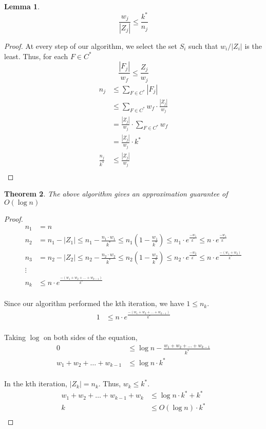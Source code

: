 \documentclass[10pt]{article}
\newtheorem{theorem}{Theorem}[section]
\newtheorem{lemma}[theorem]{Lemma}
\begin{document}
\begin{lemma}
$$
\frac{w_j}{|Z_j|} \leq \frac{k^*}{n_j}
$$
\end{lemma}
\begin{proof}
At every step of our algorithm, we select the set $S_i$ such that $w_i / |Z_i|$ is the least. Thus, for each $F \in C^*$
\[
\frac{|F_j|}{w_f} \leq \frac{Z_j}{w_j}
\]
\begin{align*}
n_j & \leq \displaystyle \sum_{F \in C^*} |F_j| \\
    & \leq \displaystyle \sum_{F \in C^*} w_f \cdot \frac{|Z_j|}{w_j} \\
    & = \frac{|Z_j|}{w_j} \cdot \displaystyle \sum_{F \in C^*} w_f \\
    & = \frac{|Z_j|}{w_j} \cdot k^* \\
\frac{n_j}{k^*} & \leq \frac{|Z_j|}{w_j} \\
\end{align*}
\end{proof}
\bigskip

\begin{theorem}
The above algorithm gives an approximation guarantee of $O(\log{n})$
\end{theorem}
\begin{proof}
\begin{align*}
n_1 & = n \\
n_2 & = n_1 - |Z_1| \leq n_1 - \frac{n_1 \cdot w_1}{k^*} \leq n_1(1 - \frac{w_1}{k^*}) \leq n_1 \cdot e^{\frac{-w_1}{k^*}} \leq n \cdot e^{\frac{-w_1}{k^*}} \\
n_3 & = n_2 - |Z_2| \leq n_2 - \frac{n_2 \cdot w_2}{k^*} \leq n_2(1 - \frac{w_2}{k^*}) \leq n_2 \cdot e^{\frac{-w_2}{k^*}} \leq n \cdot e^{\frac{-(w_1 + w_2)}{k^*}}\\
\vdots & \\
n_k & \leq n \cdot e^{\frac{-(w_1 + w_2 + \ldots + w_{k-1})}{k^*}} \\
\end{align*}

Since our algorithm performed the kth iteration, we have $1 \leq n_k$.
\begin{align*}
1 & \leq n \cdot e^{\frac{-(w_1 + w_2 + \ldots + w_{k-1})}{k^*}} \\
\end{align*}

Taking $\log$ on both sides of the equation,
\begin{align*}
0 & \leq \log{n} - \frac{w_1 + w_2 + \ldots + w_{k-1}}{k^*} \\
w_1 + w_2 + \ldots + w_{k-1} & \leq \log{n} \cdot k^* \\
\end{align*}

In the kth iteration, $|Z_k| = n_k$. Thus, $w_k \leq k^*$.
\begin{align*}
w_1 + w_2 + \ldots + w_{k-1} + w_k & \leq \log{n} \cdot k^* + k^* \\
k & \leq O(\log{n}) \cdot k^* \\
\end{align*}
\end{proof}
\end{document}
